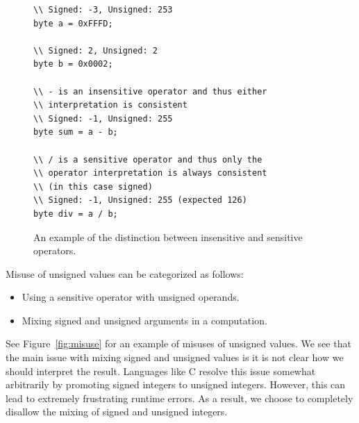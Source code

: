 \begin{figure}
\begin{lstlisting}
\\ Signed: -3, Unsigned: 253
byte a = 0xFFFD;

\\ Signed: 2, Unsigned: 2
byte b = 0x0002;

\\ - is an insensitive operator and thus either
\\ interpretation is consistent
\\ Signed: -1, Unsigned: 255
byte sum = a - b;

\\ / is a sensitive operator and thus only the
\\ operator interpretation is always consistent
\\ (in this case signed)
\\ Signed: -1, Unsigned: 255 (expected 126)
byte div = a / b;
\end{lstlisting}
\caption{An example of the distinction between insensitive and sensitive
operators.}
\label{fig:operators}
\end{figure}

Misuse of unsigned values can be categorized as follows:

\begin{itemize}
  \item Using a sensitive operator with unsigned operands.
  \item Mixing signed and unsigned arguments in a computation.
\end{itemize}

See Figure~\ref{fig:misuse} for
an example of misuses of unsigned values. We see that the main issue with
mixing signed and unsigned values is it is not clear how we should interpret the
result. Languages like C resolve this issue somewhat arbitrarily by promoting
signed integers to unsigned integers. However, this can lead to extremely
frustrating runtime errors. As a result, we choose to completely disallow
the mixing of signed and unsigned integers.

